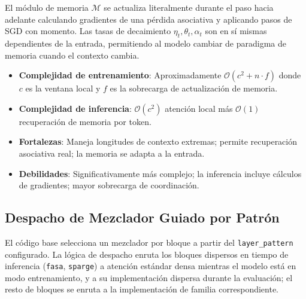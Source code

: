 El módulo de memoria $\mathcal{M}$ se actualiza literalmente durante el paso hacia adelante calculando gradientes de una pérdida asociativa y aplicando pasos de SGD con momento. Las tasas de decaimiento $\eta_t, \theta_t, \alpha_t$ son en sí mismas dependientes de la entrada, permitiendo al modelo cambiar de paradigma de memoria cuando el contexto cambia.

\begin{itemize}[leftmargin=*]
    \item \textbf{Complejidad de entrenamiento}: Aproximadamente $\mathcal{O}(c^2 + n \cdot f)$ donde $c$ es la ventana local y $f$ es la sobrecarga de actualización de memoria.
    \item \textbf{Complejidad de inferencia}: $\mathcal{O}(c^2)$ atención local más $\mathcal{O}(1)$ recuperación de memoria por token.
    \item \textbf{Fortalezas}: Maneja longitudes de contexto extremas; permite recuperación asociativa real; la memoria se adapta a la entrada.
    \item \textbf{Debilidades}: Significativamente más complejo; la inferencia incluye cálculos de gradientes; mayor sobrecarga de coordinación.
\end{itemize}

\subsection{Despacho de Mezclador Guiado por Patrón}

El código base selecciona un mezclador por bloque a partir del \texttt{layer\_pattern} configurado. La lógica de despacho enruta los bloques dispersos en tiempo de inferencia (\texttt{fasa}, \texttt{sparge}) a atención estándar densa mientras el modelo está en modo entrenamiento, y a su implementación dispersa durante la evaluación; el resto de bloques se enruta a la implementación de familia correspondiente.

